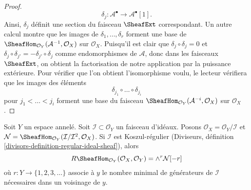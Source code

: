 \begin{proof}
$$
\delta_j : \mathcal{A}^\bullet \to \mathcal{A}^\bullet[1].
$$
Ainsi, $\delta_j$ définit une section du faisceau $\SheafExt$ correspondant. Un autre calcul montre que les images de $\delta_1, \ldots, \delta_r$ forment une base de $\SheafHom_{\mathcal{O}_Y}(\mathcal{A}^{-1}, \mathcal{O}_X)$ sur $\mathcal{O}_X$. Puisqu'il est clair que $\delta_j \circ \delta_j = 0$ et $\delta_j \circ \delta_{j'} = - \delta_{j'} \circ \delta_j$ comme endomorphismes de $\mathcal{A}$, donc dans les faisceaux $\SheafExt$, on obtient la factorisation de notre application par la puissance extérieure. Pour vérifier que l'on obtient l'isomorphisme voulu, le lecteur vérifiera que les images des éléments
$$
\delta_{j_1} \circ \ldots \circ \delta_{j_i}
$$
pour $j_1 < \ldots < j_i$ forment une base du faisceau
$\SheafHom_{\mathcal{O}_Y}(\mathcal{A}^{-i}, \mathcal{O}_X)$
sur $\mathcal{O}_X$.
\end{proof}

\begin{lemma}
\label{lemma-regular-immersion-ext}
Soit $Y$ un espace annelé. Soit $\mathcal{I} \subset \mathcal{O}_Y$ un faisceau d'idéaux. Posons $\mathcal{O}_X = \mathcal{O}_Y/\mathcal{I}$ et $\mathcal{N} =
\SheafHom_{\mathcal{O}_Y}(\mathcal{I}/\mathcal{I}^2, \mathcal{O}_X)$. Si $\mathcal{I}$ est Koszul-régulier (Diviseurs, définition \ref{divisors-definition-regular-ideal-sheaf}), alors
$$
R\SheafHom_{\mathcal{O}_Y}(\mathcal{O}_X, \mathcal{O}_Y) =
\wedge^r \mathcal{N}[-r]
$$
où $r : Y \to \{1, 2, 3, \ldots \}$ associe à $y$ le nombre minimal de générateurs de $\mathcal{I}$ nécessaires dans un voisinage de $y$.
\end{lemma}

